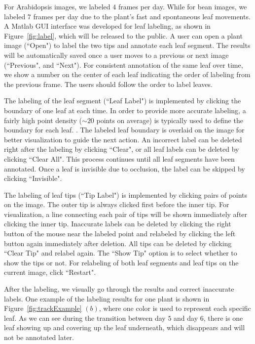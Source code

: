 For Arabidopsis images, we labeled $4$ frames per day.
While for bean images, we labeled $7$ frames per day due to the plant's fast and spontaneous leaf movements.
A Matlab GUI interface was developed for leaf labeling, as shown in Figure~\ref{fig:label}, which will be released to the public.
A user can open a plant image (``Open") to label the two tips and annotate each leaf segment.
The results will be automatically saved once a user moves to a previous or next image (``Previous", and ``Next").
For consistent annotation of the same leaf over time, we show a number on the center of each leaf indicating the order of labeling from the previous frame.
The users should follow the order to label leaves. 

The labeling of the leaf segment (``Leaf Label") is implemented by clicking the boundary of one leaf at each time.
In order to provide more accurate labeling, a fairly high point density ($\sim20$ points on average) is typically used to define the boundary for each leaf. .
The labeled leaf boundary is overlaid on the image for better visualization to guide the next action.
An incorrect label can be deleted right after the labeling by clicking ``Clear", or all leaf labels can be deleted by clicking ``Clear All".
This process continues until all leaf segments have been annotated.
Once a leaf is invisible due to occlusion, the label can be skipped by clicking ``Invisible".

The labeling of leaf tips (``Tip Label") is implemented by clicking pairs of points on the image.
The outer tip is always clicked first before the inner tip.
For visualization, a line connecting each pair of tips will be shown immediately after clicking the inner tip.
Inaccurate labels can be deleted by clicking the right button of the mouse near the labeled point and relabeled by clicking the left button again immediately after deletion.
All tips can be deleted by clicking ``Clear Tip" and relabel again.
The ``Show Tip" option is to select whether to show the tips or not.
For relabeling of both leaf segments and leaf tips on the current image, click ``Restart".

After the labeling, we visually go through the results and correct inaccurate labels.
One example of the labeling results for one plant is shown in Figure~\ref{fig:trackExample} $(b)$, where one color is used to represent each specific leaf.
As we can see during the transition between day $5$ and day $6$, there is one leaf showing up and covering up the leaf underneath, which disappears and will not be annotated later.


